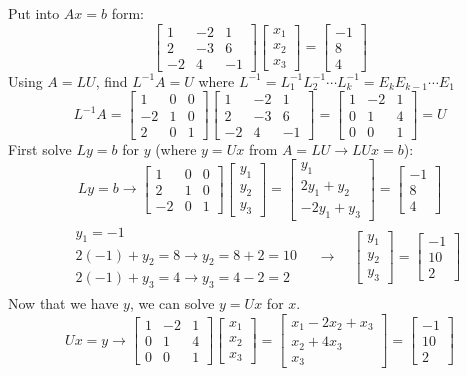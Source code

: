 \documentclass[]{article}
\newcommand{\bmat}[1]{\begin{bmatrix}#1\end{bmatrix}}
\begin{document}
	\section{}
	Put into $Ax = b$ form:
	\[ \bmat{1&-2&1\\2&-3&6\\-2&4&-1}\bmat{x_1\\x_2\\x_3} = \bmat{-1\\8\\4} \]
	Using $A = LU$, find $L^{-1}A = U$ where $L^{-1} = L_1^{-1}L_2^{-1}\cdots L_k^{-1} = E_kE_{k-1}\cdots E_1$
	\[ L^{-1}A = \bmat{1&0&0\\-2&1&0\\2&0&1} \bmat{1&-2&1\\2&-3&6\\-2&4&-1} = \bmat{1 & -2 & 1\\0&1&4\\0&0&1} = U\]
	First solve $Ly = b$ for $y$ (where $y = Ux$ from $A = LU \rightarrow LUx = b$):
	\[ Ly = b \longrightarrow \bmat{1&0&0\\2&1&0\\-2&0&1}\bmat{y_1\\y_2\\y_3} = \bmat{y_1\\2y_1 + y_2\\-2y_1 + y_3} = \bmat{-1\\8\\4} \]
	\begin{gather*}
	\begin{aligned}
		& y_1 = -1\\
		& 2(-1) + y_2 = 8 \rightarrow y_2 = 8 + 2 = 10\\
		& 2(-1) + y_3 = 4 \rightarrow y_3 = 4 - 2 = 2
	\end{aligned} \quad \longrightarrow \quad \bmat{y_1\\y_2\\y_3} = \bmat{-1\\10\\2}
	\end{gather*}
	Now that we have $y$, we can solve $y = Ux$ for $x$.
	\[ Ux = y \longrightarrow \bmat{1&-2&1\\0&1&4\\0&0&1}\bmat{x_1\\x_2\\x_3} = \bmat{x_1 - 2x_2 + x_3\\x_2 + 4x_3\\x_3} = \bmat{-1\\10\\2} \]
\end{document}
